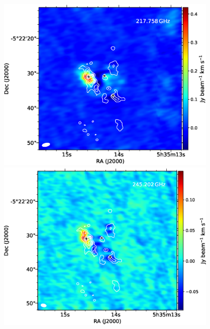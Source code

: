 \begin{figure}[htbp] 
\begin{center}
\begin{minipage}{0.98\textwidth} 
\begin{center}
\begin{minipage}{0.48\textwidth}
\begin{center}
\includegraphics[width=0.98\textwidth]{OrionKL/mom0/217.758mom0_3-7.eps}
\end{center}
\end{minipage}
\begin{minipage}{0.48\textwidth}
\begin{center}
\includegraphics[width=0.98\textwidth]{OrionKL/mom0/245.202mom0_3-7.eps}
\end{center}
\end{minipage}
\end{center}
\end{minipage}


\end{center}
\end{figure}
